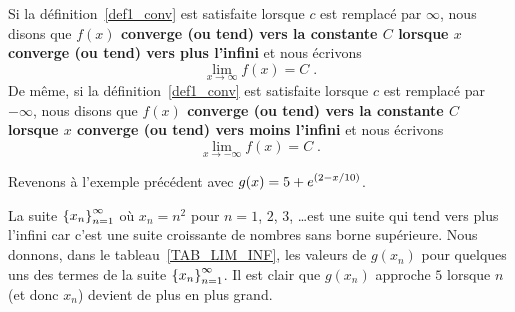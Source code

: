 {\begin{defn} 
Si la définition~\ref{def1_conv} est satisfaite lorsque $c$ est
remplacé par $\infty$, nous disons que {\bfseries $f(x)$ converge (ou tend)
vers la constante $C$ lorsque $x$ converge (ou tend) vers plus
l'infini} et nous écrivons
\[
\lim_{x\rightarrow \infty} f(x) = C \; .
\]
De même, si la définition~\ref{def1_conv} est satisfaite lorsque $c$
est remplacé par $-\infty$, nous disons que {\bfseries $f(x)$ converge (ou
tend) vers la constante $C$ lorsque $x$ converge (ou tend) vers moins
l'infini} et nous écrivons
\[
\lim_{x\rightarrow -\infty} f(x) = C \; .
\]
\label{def_of_lim_of_f_at_inf}
\end{defn}

\begin{egg}
Revenons à l'exemple précédent avec
$\displaystyle g(x) = 5 + e^{\left(2 - x/10\right)}$.

La suite $\displaystyle \left\{ x_n \right\}_{n=1}^\infty$ où
$x_n = n^2$ pour $n=1$, $2$, $3$, \ldots est une suite qui tend vers
plus l'infini car c'est une suite croissante de nombres sans borne
supérieure.  Nous donnons, dans le tableau~\ref{TAB_LIM_INF}, les valeurs
de $g(x_n)$ pour quelques uns des termes de la suite
$\displaystyle \left\{ x_n\right\}_{n=1}^\infty$.  Il est clair que
$g(x_n)$ approche $5$ lorsque $n$ (et donc $x_n$) devient de plus en
plus grand.


\end{egg}}
